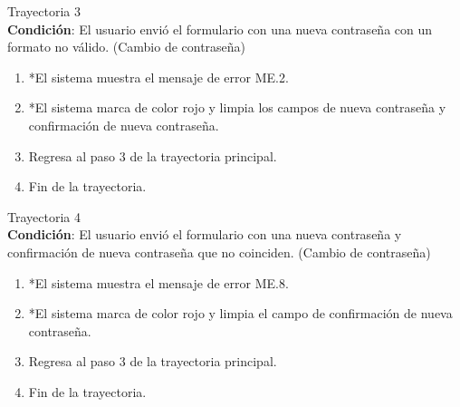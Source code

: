 \large{Trayectoria 3}\\
\textbf{Condición}: El usuario envió el formulario con una nueva contraseña con un formato no válido. (Cambio de contraseña)
\begin{enumerate}
    \item *El sistema muestra el mensaje de error ME.2.
    \item *El sistema marca de color rojo y limpia los campos de nueva contraseña y confirmación de nueva contraseña.
    \item Regresa al paso 3 de la trayectoria principal.
    \item Fin de la trayectoria.
\end{enumerate}
\large{Trayectoria 4}\\
\textbf{Condición}: El usuario envió el formulario con una nueva contraseña y confirmación de nueva contraseña que no coinciden. (Cambio de contraseña)
\begin{enumerate}
    \item *El sistema muestra el mensaje de error ME.8.
    \item *El sistema marca de color rojo y limpia el campo de confirmación de nueva contraseña.
    \item Regresa al paso 3 de la trayectoria principal.
    \item Fin de la trayectoria.
\end{enumerate}